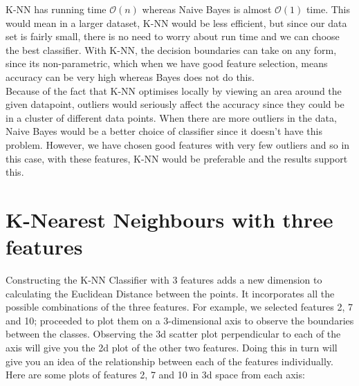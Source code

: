 \documentclass[11pt]{article}
\begin{document}
\noindent
K-NN has running time $\mathcal{O}(n)$ whereas Naive Bayes is almost $\mathcal{O}(1)$ time. This would mean in a larger dataset, K-NN would be less efficient, but since our data set is fairly small, there is no need to worry about run time and we can choose the best classifier.
With K-NN, the decision boundaries can take on any form, since its non-parametric, which when we have good feature selection, means accuracy can be very high whereas Bayes does not do this.\\

\noindent
Because of the fact that K-NN optimises locally by viewing an area around the given datapoint, outliers would seriously affect the accuracy since they could be in a cluster of different data points. When there are more outliers in the data, Naive Bayes would be a better choice of classifier since it doesn't have this problem. However, we have chosen good features with very few outliers and so in this case, with these features, K-NN would be preferable and the results support this.
\\
\section*{K-Nearest Neighbours with three features}

Constructing the K-NN Classifier with 3 features adds a new dimension to calculating the Euclidean Distance between the points. It incorporates all the possible combinations of the three features. For example, we selected features 2, 7 and 10; proceeded to plot them on a 3-dimensional axis to observe the boundaries between the classes. Observing the 3d scatter plot perpendicular to each of the axis will give you the 2d plot of the other two features. Doing this in turn will give you an idea of the relationship between each of the features individually. \\

\noindent
Here are some plots of features 2, 7 and 10 in 3d space from each axis:
\end{document}
